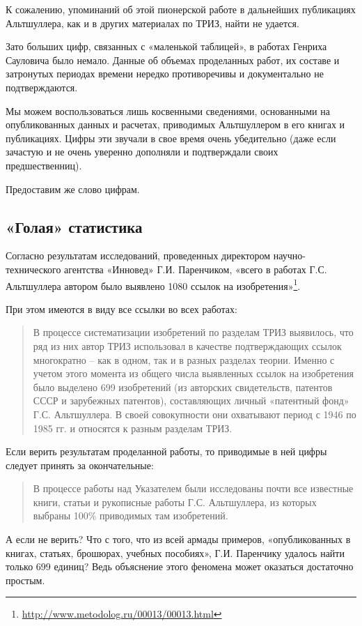 \documentclass[11pt,a4paper]{article}
\begin{document}
К сожалению, упоминаний об этой пионерской работе в дальнейших публикациях
Альтшуллера, как и в других материалах по ТРИЗ, найти не удается.

Зато больших цифр, связанных с «маленькой таблицей», в работах Генриха
Сауловича было немало. Данные об объемах проделанных работ, их составе и
затронутых периодах времени нередко противоречивы и документально не
подтверждаются.

Мы можем воспользоваться лишь косвенными сведениями, основанными на
опубликованных данных и расчетах, приводимых Альтшуллером в его книгах и
публикациях. Цифры эти звучали в свое время очень убедительно (даже если
зачастую и не очень уверенно дополняли и подтверждали своих предшественниц).

Предоставим же слово цифрам.

\subsection*{«Голая» статистика}

Согласно результатам исследований, проведенных директором научно-технического
агентства «Инновед» Г.И. Паренчиком, «всего в работах Г.С. Альтшуллера автором
было выявлено 1080 ссылок на
изобретения»\footnote{\url{http://www.metodolog.ru/00013/00013.html}}.

При этом имеются в виду все ссылки во всех работах:
\begin{quote}
  В процессе систематизации изобретений по разделам ТРИЗ выявилось, что ряд из
  них автор ТРИЗ использовал в качестве подтверждающих ссылок многократно --
  как в одном, так и в разных разделах теории. Именно с учетом этого момента
  из общего числа выявленных ссылок на изобретения было выделено 699
  изобретений (из авторских свидетельств, патентов СССР и зарубежных
  патентов), составляющих личный «патентный фонд» Г.С. Альтшуллера. В своей
  совокупности они охватывают период с 1946 по 1985 гг. и относятся к разным
  разделам ТРИЗ.
\end{quote}
Если верить результатам проделанной работы, то приводимые в ней цифры следует
принять за окончательные:
\begin{quote}
  В процессе работы над Указателем были исследованы почти все известные книги,
  статьи и рукописные работы Г.С. Альтшуллера, из которых выбраны 100\%
  приводимых там изобретений.
\end{quote}
А если не верить? Что с того, что из всей армады примеров, «опубликованных в
книгах, статьях, брошюрах, учебных пособиях», Г.И. Паренчику удалось найти
только 699 единиц? Ведь объяснение этого феномена может оказаться достаточно
простым.
\end{document}
